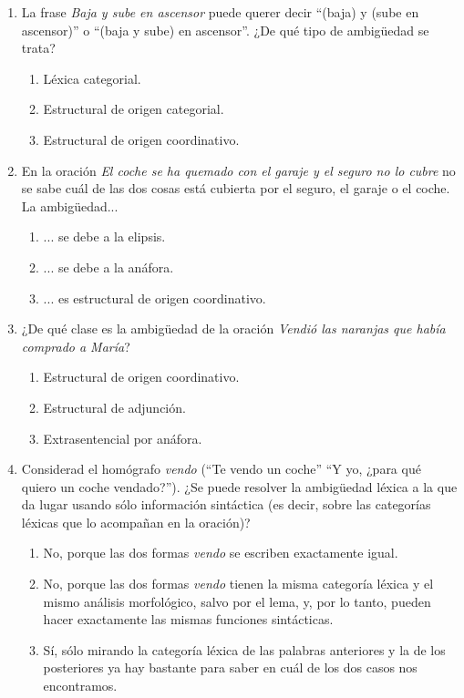 \begin{enumerate}
\item La frase \emph{Baja y sube en ascensor} puede querer decir ``(baja) y (sube en ascensor)'' o ``(baja y sube) en ascensor''. ¿De qué tipo de ambigüedad se trata? \begin{enumerate} \item Léxica categorial. \item Estructural de origen categorial. \item Estructural de origen coordinativo. \end{enumerate} 

\item En la oración \emph{El coche se ha quemado con el garaje y el seguro no lo cubre} no se sabe cuál de las dos cosas está cubierta por el seguro, el garaje o el coche. La ambigüedad... \begin{enumerate} \item ... se debe a la elipsis. \item ... se debe a la anáfora. \item ... es estructural de origen coordinativo. \end{enumerate} 

\item ¿De qué clase es la ambigüedad de la oración \emph{Vendió las naranjas que había comprado a María}? \begin{enumerate} \item Estructural de origen coordinativo. \item Estructural de adjunción. \item Extrasentencial por anáfora. \end{enumerate} 

\item Considerad el homógrafo \emph{vendo} (``Te vendo un coche'' ``Y yo, ¿para qué quiero un coche vendado?''). ¿Se puede resolver la ambigüedad léxica a la que da lugar usando sólo información sintáctica (es decir, sobre las categorías léxicas que lo acompañan en la oración)? \begin{enumerate} \item No, porque las dos formas \emph{vendo} se escriben exactamente igual. \item No, porque las dos formas \emph{vendo} tienen la misma categoría léxica y el mismo análisis morfológico, salvo por el lema, y, por lo tanto, pueden hacer exactamente las mismas funciones sintácticas. \item Sí, sólo mirando la categoría léxica de las palabras anteriores y la de los posteriores ya hay bastante para saber en cuál de los dos casos nos encontramos. \end{enumerate} 


\end{enumerate}
